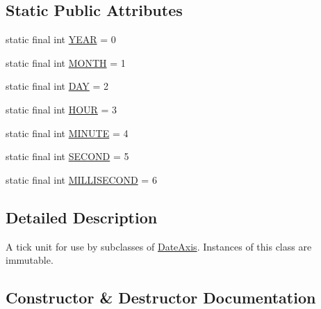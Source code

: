 \subsection*{Static Public Attributes}
\begin{DoxyCompactItemize}
\item 
static final int \mbox{\hyperlink{classorg_1_1jfree_1_1chart_1_1axis_1_1_date_tick_unit_a95a5f9f2c3c0b99f4c6cd309cd5e6079}{Y\+E\+AR}} = 0
\item 
static final int \mbox{\hyperlink{classorg_1_1jfree_1_1chart_1_1axis_1_1_date_tick_unit_aa0906361a1b228d9d74f03b85c630e23}{M\+O\+N\+TH}} = 1
\item 
static final int \mbox{\hyperlink{classorg_1_1jfree_1_1chart_1_1axis_1_1_date_tick_unit_a86e8236f655aae09eb7ed58fcb522afd}{D\+AY}} = 2
\item 
static final int \mbox{\hyperlink{classorg_1_1jfree_1_1chart_1_1axis_1_1_date_tick_unit_a7668877b64b0d6c95014b2884ee255c2}{H\+O\+UR}} = 3
\item 
static final int \mbox{\hyperlink{classorg_1_1jfree_1_1chart_1_1axis_1_1_date_tick_unit_a70172f50a1e8d0f5d98f27305b988e81}{M\+I\+N\+U\+TE}} = 4
\item 
static final int \mbox{\hyperlink{classorg_1_1jfree_1_1chart_1_1axis_1_1_date_tick_unit_a84b9c370c562909c7320e928c4251749}{S\+E\+C\+O\+ND}} = 5
\item 
static final int \mbox{\hyperlink{classorg_1_1jfree_1_1chart_1_1axis_1_1_date_tick_unit_a48f8080b073381d8486831ba27c72e3b}{M\+I\+L\+L\+I\+S\+E\+C\+O\+ND}} = 6
\end{DoxyCompactItemize}


\subsection{Detailed Description}
A tick unit for use by subclasses of \mbox{\hyperlink{classorg_1_1jfree_1_1chart_1_1axis_1_1_date_axis}{Date\+Axis}}. Instances of this class are immutable. 

\subsection{Constructor \& Destructor Documentation}
\mbox{\label{classorg_1_1jfree_1_1chart_1_1axis_1_1_date_tick_unit_a900b9f19584c2bbc89da92c80b16539a}} 
